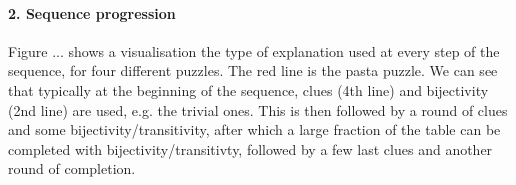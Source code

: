 \begin{table}
	\centering
\caption{Puzzle explanation cost based on the cost function $f(I, C)$ and statistics on puzzle constraints}
\label{table:sequence_leve}
\end{table}

\paragraph{2. Sequence progression}
Figure ... shows a visualisation the type of explanation used at every step of the sequence, for four different puzzles. The red line is the pasta puzzle. We can see that typically at the beginning of the sequence, clues (4th line) and bijectivity (2nd line) are used, e.g. the trivial ones. This is then followed by a round of clues and some bijectivity/transitivity, after which a large fraction of the table can be completed with bijectivity/transitivty, followed by a few last clues and another round of completion.

